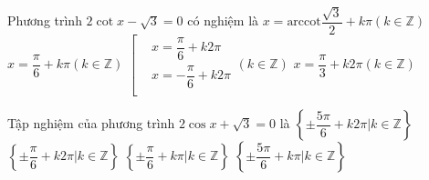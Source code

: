 \begin{ex}%
	Phương trình $2\cot x-\sqrt{3}=0$ có nghiệm là
	\choice
	{\True $x=\text{arccot}\dfrac{\sqrt{3}}{2}+k\pi \left( k\in \mathbb{Z} \right)$}
	{$x=\dfrac{\pi }{6}+k\pi \left( k\in \mathbb{Z} \right)$}
	{$\left[ \begin{aligned}
		  & x=\dfrac{\pi }{6}+k2\pi  \\ 
		 & x=-\dfrac{\pi }{6}+k2\pi  \\ 
		\end{aligned} \right.\left( k\in \mathbb{Z} \right)$}
	{$x=\dfrac{\pi }{3}+k2\pi \left( k\in \mathbb{Z} \right)$}
\end{ex}

\begin{ex}%
	Tập nghiệm của phương trình $2\cos x+\sqrt{3}=0$ là
	\choice
	{\True $\left\{ \pm \dfrac{5\pi }{6}+k2\pi |k\in \mathbb{Z} \right\}$}
	{$\left\{ \pm \dfrac{\pi }{6}+k2\pi |k\in \mathbb{Z} \right\}$}
	{$\left\{ \pm \dfrac{\pi }{6}+k\pi |k\in \mathbb{Z} \right\}$}
	{$\left\{ \pm \dfrac{5\pi }{6}+k\pi |k\in \mathbb{Z} \right\}$}
\end{ex}


